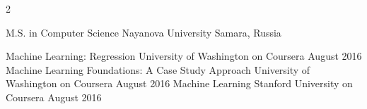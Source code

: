 \documentclass[9pt,a4paper]{igrmkcv}
\begin{document}
\begin{paracol}{2}
    \vspace{6pt}
    {
        \raggedright
    }

    \cvRightEventNoContent
        {M.S. in Computer Science}
        {Nayanova University}
        {}
        {Samara, Russia}

    \cvRightEventNoContent
        {Machine Learning: Regression}
        {University of Washington on Coursera}
        {August 2016}
        {}
    \cvRightEventNoContent
        {Machine Learning Foundations: A Case Study Approach}
        {University of Washington on Coursera}
        {August 2016}
        {}
    \cvRightEventNoContent
        {Machine Learning}
        {Stanford University on Coursera}
        {August 2016}
        {}

\end{paracol}
\end{document}
